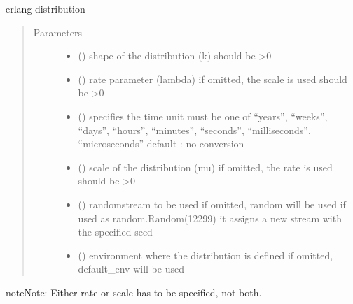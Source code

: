 \documentclass[letterpaper,10pt,english]{sphinxmanual}
\begin{document}
\begin{fulllineitems}
\label{\detokenize{Reference:salabim.Erlang}}
erlang distribution
\begin{quote}\begin{description}
\item[{Parameters}] \leavevmode\begin{itemize}
\item {} 
 () \textendash{} shape of the distribution (k) 
should be \textgreater{}0

\item {} 
 () \textendash{} rate parameter (lambda) 
if omitted, the scale is used 
should be \textgreater{}0

\item {} 
 () \textendash{} specifies the time unit 
must be one of “years”, “weeks”, “days”, “hours”, “minutes”, “seconds”, “milliseconds”, “microseconds” 
default : no conversion 

\item {} 
 () \textendash{} scale of the distribution (mu) 
if omitted, the rate is used 
should be \textgreater{}0

\item {} 
 () \textendash{} randomstream to be used 
if omitted, random will be used 
if used as random.Random(12299)
it assigns a new stream with the specified seed

\item {} 
 ({\hyperref[\detokenize{Reference:salabim.Environment}]{}}) \textendash{} environment where the distribution is defined 
if omitted, default\_env will be used

\end{itemize}

\end{description}\end{quote}

\begin{sphinxadmonition}{note}{Note:}
Either rate or scale has to be specified, not both.
\end{sphinxadmonition}


\end{fulllineitems}
\end{document}
